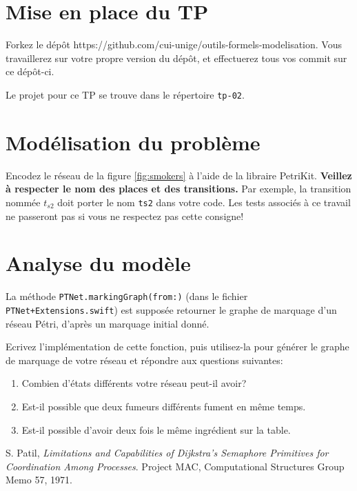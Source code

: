 \documentclass[a4paper, titlepage]{article}
\numberwithin{figure}{section}
\numberwithin{table}{section}
\begin{document}
\section{Mise en place du TP}

Forkez le dépôt https://github.com/cui-unige/outils-formels-modelisation.
Vous travaillerez sur votre propre version du dépôt,
et effectuerez tous vos commit sur ce dépôt-ci.

Le projet pour ce TP se trouve dans le répertoire \texttt{tp-02}.

\section{Modélisation du problème}

Encodez le réseau de la figure \ref{fig:smokers} à l'aide de la libraire PetriKit.
\textbf{Veillez à respecter le nom des places et des transitions.}
Par exemple, la transition nommée $t_{s2}$ doit porter le nom \texttt{ts2} dans votre code.
Les tests associés à ce travail ne passeront pas si vous ne respectez pas cette consigne!

\section{Analyse du modèle}

La méthode \texttt{PTNet.markingGraph(from:)}
(dans le fichier \texttt{PTNet+Extensions.swift})
est supposée retourner le graphe de marquage d'un réseau Pétri,
d'après un marquage initial donné.

Ecrivez l'implémentation de cette fonction,
puis utilisez-la pour générer le graphe de marquage de votre réseau
et répondre aux questions suivantes:

\begin{enumerate}
  \item Combien d'états différents votre réseau peut-il avoir?
  \item Est-il possible que deux fumeurs différents fument en même temps.
  \item Est-il possible d'avoir deux fois le même ingrédient sur la table.
\end{enumerate}

\begin{thebibliography}{9}

  S. Patil,
  \emph{Limitations and Capabilities of Dijkstra's Semaphore Primitives for Coordination Among Processes}.
  Project MAC,
  Computational Structures Group Memo 57,
  1971.

\end{thebibliography}
\end{document}
